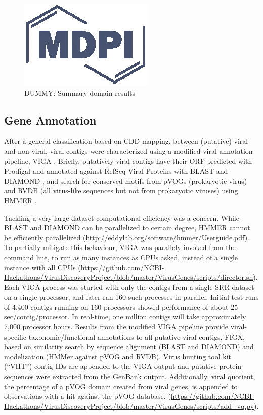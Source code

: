  \begin{figure}
    \centering
    \includegraphics{Definitions/logo-mdpi}
    \caption{DUMMY: Summary domain results
            \label{fig:domain_summary}}
  \end{figure}

  \subsection{Gene Annotation}
  After a general classification based on CDD mapping, between (putative)
  viral and non-viral, viral contigs were characterized using a modified viral
  annotation pipeline, VIGA \cite{Gonzalez-Tortuero2018}. Briefly, putatively
  viral contigs have their ORF predicted with Prodigal \cite{Hyatt2010} and
  annotated against RefSeq Viral Proteins with BLAST \citep{Camacho2009} and
  DIAMOND \citep{Buchfink2015}; and search for conserved motifs
  from pVOGs \citep{Grazziotin2017} (prokaryotic virus) and RVDB \cite{Goodacre2018}
  (all virus-like sequences but not from prokaryotic viruses) using HMMER
  \cite{hmmer}.


  Tackling a very large dataset computational efficiency was a concern. While
  BLAST and DIAMOND can be parallelized to certain degree, HMMER cannot be
  efficiently parallelized
  (\url{http://eddylab.org/software/hmmer/Userguide.pdf}). To partially
  mitigate this behaviour, VIGA was parallely invoked from the command line, to
  run as many instances as CPUs asked, instead of a single instance with all
  CPUs
  (\url{https://github.com/NCBI-Hackathons/VirusDiscoveryProject/blob/master/VirusGenes/scripts/director.sh}).
  Each VIGA process was started with only the contigs from a single SRR dataset
  on a single processor, and later ran 160 such processes in parallel. Initial
  test runs of 4,400 contigs running on 160 processors showed performance of
  about 25 sec/contig/processor. In real-time, one million contigs will take
  approximately 7,000 processor hours. Results from the modified VIGA pipeline
  provide viral-specific taxonomic/functional annotations to all putative viral
  contigs, FIGX, based on similarity search by sequence alignment (BLAST and
  DIAMOND) and modelization (HMMer against pVOG and RVDB). Virus hunting tool
  kit (“VHT”) contig IDs are appended to the VIGA output and putative protein
  sequences were extracted from the GenBank output. Additionally, viral
  quotient, the percentage of a pVOG domain created from viral genes, is
  appended to observations with a hit against the pVOG database.
  (\url{https://github.com/NCBI-Hackathons/VirusDiscoveryProject/blob/master/VirusGenes/scripts/add_vq.py}).


